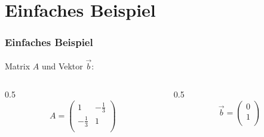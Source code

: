 \section{Einfaches Beispiel}

\begin{frame}
    \frametitle{Einfaches Beispiel}

    Matrix $A$ und Vektor $\vec{b}$:
    \begin{columns}[c]
        \begin{column}{0.5\hsize}\centering
            $$A = \begin{pmatrix} 1 & -\frac{1}{3}\\ -\frac{1}{3} & 1\\ \end{pmatrix}$$
        \end{column}

        \begin{column}{0.5\hsize}
            $$\vec{b} = \begin{pmatrix} 0 \\ 1\\ \end{pmatrix}$$
        \end{column}
    \end{columns}
 
    \hfil

    \hfil



\end{frame}

